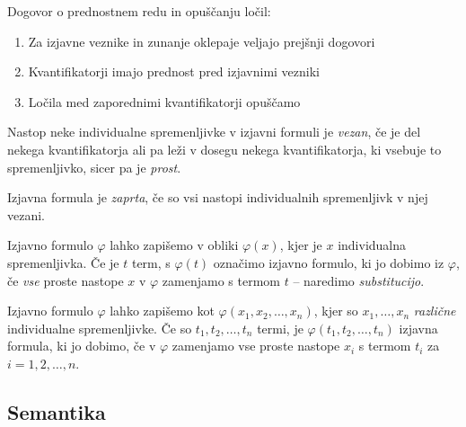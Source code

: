 \documentclass[12pt, a4paper]{article}
\begin{document}
\begin{definicija}
Dogovor o prednostnem redu in opuščanju ločil:

\begin{enumerate}
\item Za izjavne veznike in zunanje oklepaje veljajo prejšnji dogovori
\item Kvantifikatorji imajo prednost pred izjavnimi vezniki
\item Ločila med zaporednimi kvantifikatorji opuščamo
\end{enumerate}
\end{definicija}

\begin{definicija}
Nastop neke individualne spremenljivke v izjavni formuli je \emph{vezan}, če je del nekega kvantifikatorja ali pa leži v dosegu nekega kvantifikatorja, ki vsebuje to spremenljivko, sicer pa je \emph{prost}.
\end{definicija}

\begin{definicija}
Izjavna formula je \emph{zaprta}, če so vsi nastopi individualnih spremenljivk v njej vezani.
\end{definicija}

Izjavno formulo $\varphi$ lahko zapišemo v obliki $\varphi(x)$, kjer je $x$ individualna spremenljivka. Če je $t$ term, s $\varphi(t)$ označimo izjavno formulo, ki jo dobimo iz $\varphi$, če \emph{vse} proste nastope $x$ v $\varphi$ zamenjamo s termom $t$ -- naredimo \emph{substitucijo}.

Izjavno formulo $\varphi$ lahko zapišemo kot $\varphi(x_1,x_2,\dots,x_n)$, kjer so $x_1,\dots,x_n$ \emph{različne} individualne spremenljivke. Če so $t_1,t_2,\dots,t_n$ termi, je $\varphi(t_1,t_2,\dots,t_n)$ izjavna formula, ki jo dobimo, če v $\varphi$ zamenjamo vse proste nastope $x_i$ s termom $t_i$ za $i=1,2,\dots,n$.

\newpage

\subsection{Semantika}
\end{document}

